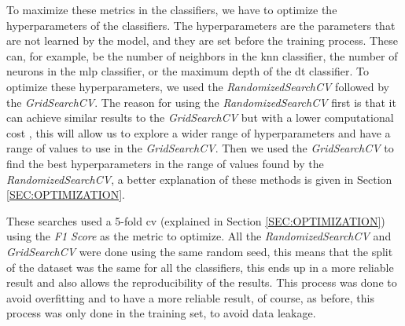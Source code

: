 To maximize these metrics in the classifiers, we have to optimize the hyperparameters of the classifiers. The hyperparameters are the parameters that are not learned by the model, and they are set before the training process. These can, for example, be the number of neighbors in the \ac{knn} classifier, the number of neurons in the \ac{mlp} classifier, or the maximum depth of the \ac{dt} classifier. To optimize these hyperparameters, we used the \textit{RandomizedSearchCV} followed by the \textit{GridSearchCV}. The reason for using the \textit{RandomizedSearchCV} first is that it can achieve similar results to the \textit{GridSearchCV} but with a lower computational cost \cite{bergstra_random_nodate}, this will allow us to explore a wider range of hyperparameters and have a range of values to use in the \textit{GridSearchCV}. Then we used the \textit{GridSearchCV} to find the best hyperparameters in the range of values found by the \textit{RandomizedSearchCV}, a better explanation of these methods is given in Section \ref{SEC:OPTIMIZATION}.

These searches 
used
a 5-fold \ac{cv} (explained in Section \ref{SEC:OPTIMIZATION}) using the \textit{F1 Score} as the metric to optimize. All the \textit{RandomizedSearchCV} and \textit{GridSearchCV} were done using the same random seed, this means that the split of the dataset was the same for all the classifiers, this ends up in a more reliable result and also allows the reproducibility of the results. This process was done to avoid overfitting and to have a more reliable result, of course, as before, this process was only done in the training set, to avoid data leakage.